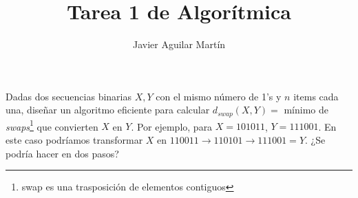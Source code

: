 \documentclass[twoside]{article}
\begin{document}
\title{Tarea 1 de Algorítmica}
\author{Javier Aguilar Martín}
\maketitle


\begin{ejercicio}{1}
Dadas dos secuencias binarias $X,Y$ con el mismo número de 1's y $n$ items cada una, diseñar un algoritmo eficiente para calcular $d_{swap}(X,Y)=$ mínimo de \emph{swaps}\footnote{swap es una trasposición de elementos contiguos} que convierten $X$ en $Y$. Por ejemplo, para $X=101011$, $Y=111001$. En este caso podríamos transformar $X$ en $110011\to 110101\to 111001=Y$. ¿Se podría hacer en dos pasos?
\end{ejercicio}
\begin{solucion}

\end{solucion}
\end{document}
